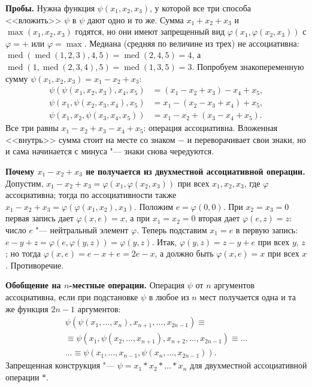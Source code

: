\begin{solution}[6 (\S\,4)]
\textbf{Пробы.} Нужна функция $\psi(x_1,x_2,x_3)$, у которой все три способа
<<вложить>> $\psi$ в $\psi$ дают одно и то же. Сумма $x_1+x_2+x_3$ и
$\max(x_1,x_2,x_3)$ годятся, но они имеют запрещенный вид
$\varphi(x_1,\varphi(x_2,x_3))$ с $\varphi=+$ или $\varphi=\max$. Медиана
(средняя по величине из трех) не ассоциативна:
$\operatorname{med}(\operatorname{med}(1,2,3),4,5)=\operatorname{med}(2,4,5)=4$,
а $\operatorname{med}(1,\operatorname{med}(2,3,4),5)=\operatorname{med}(1,3,5)=3$.
Попробуем знакопеременную сумму $\psi(x_1,x_2,x_3)=x_1-x_2+x_3$:
\begin{align*}
\psi(\psi(x_1,x_2,x_3),x_4,x_5)&=(x_1-x_2+x_3)-x_4+x_5,\\
\psi(x_1,\psi(x_2,x_3,x_4),x_5)&=x_1-(x_2-x_3+x_4)+x_5,\\
\psi(x_1,x_2,\psi(x_3,x_4,x_5))&=x_1-x_2+(x_3-x_4+x_5).
\end{align*}
Все три равны $x_1-x_2+x_3-x_4+x_5$: операция ассоциативна. Вложенная
<<внутрь>> сумма стоит на месте со знаком $-$ и переворачивает свои знаки,
но и сама начинается с минуса "--- знаки снова чередуются.

\textbf{Почему $x_1-x_2+x_3$ не получается из двухместной ассоциативной
операции.} Допустим, $x_1-x_2+x_3=\varphi(x_1,\varphi(x_2,x_3))$ при всех
$x_1,x_2,x_3$, где $\varphi$ ассоциативна; тогда по ассоциативности также
$x_1-x_2+x_3=\varphi(\varphi(x_1,x_2),x_3)$. Положим $e=\varphi(0,0)$.
При $x_2=x_3=0$ первая запись дает $\varphi(x,e)=x$, а при $x_1=x_2=0$
вторая дает $\varphi(e,z)=z$: число $e$ "--- нейтральный элемент $\varphi$.
Теперь подставим $x_1=e$ в первую запись:
$e-y+z=\varphi(e,\varphi(y,z))=\varphi(y,z)$. Итак, $\varphi(y,z)=z-y+e$
при всех $y$, $z$; но тогда $\varphi(x,e)=e-x+e=2e-x$, а должно быть
$\varphi(x,e)=x$ при всех $x$. Противоречие.

\textbf{Обобщение на $n$-местные операции.} Операция $\psi$ от $n$
аргументов ассоциативна, если при подстановке $\psi$ в любое из $n$ мест
получается одна и та же функция $2n-1$ аргументов:
\begin{multline*}
\psi(\psi(x_1,\dots,x_n),x_{n+1},\dots,x_{2n-1})\equiv{}\\
\equiv\psi(x_1,\psi(x_2,\dots,x_{n+1}),x_{n+2},\dots,x_{2n-1})\equiv\dots\\
\dots\equiv\psi(x_1,\dots,x_{n-1},\psi(x_n,\dots,x_{2n-1})).
\end{multline*}
Запрещенная конструкция "--- $\psi=x_1*x_2*\dots*x_n$ для двухместной
ассоциативной операции $*$.


\end{solution}
